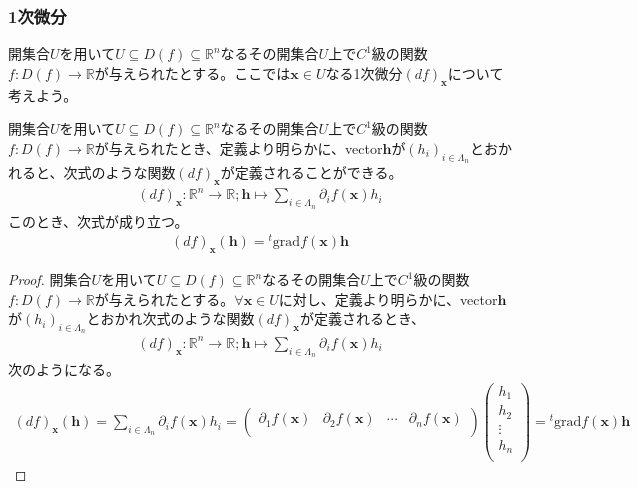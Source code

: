 \documentclass[dvipdfmx]{jsarticle}
\begin{document}
\subsubsection{1次微分}%
開集合$U$を用いて$U \subseteq D(f) \subseteq \mathbb{R}^{n}$なるその開集合$U$上で$C^{1}$級の関数$f:D(f) \rightarrow \mathbb{R}$が与えられたとする。ここでは$\mathbf{x} \in U$なる1次微分$(df)_{\mathbf{x}}$について考えよう。
\begin{thm}\label{4.2.7.3}
開集合$U$を用いて$U \subseteq D(f) \subseteq \mathbb{R}^{n}$なるその開集合$U$上で$C^{1}$級の関数$f:D(f) \rightarrow \mathbb{R}$が与えられたとき、定義より明らかに、vector$\mathbf{h}$が$\left( h_{i} \right)_{i \in \varLambda_{n}}$とおかれると、次式のような関数$(df)_{\mathbf{x}}$が定義されることができる。
\begin{align*}
(df)_{\mathbf{x}}:\mathbb{R}^{n} \rightarrow \mathbb{R};\mathbf{h} \mapsto \sum_{i \in \varLambda_{n}} {\partial_{i}f\left( \mathbf{x} \right)h_{i}}
\end{align*}
このとき、次式が成り立つ。
\begin{align*}
(df)_{\mathbf{x}}\left( \mathbf{h} \right) ={}^{t}\mathrm{grad}f\left( \mathbf{x} \right)\mathbf{h}
\end{align*}
\end{thm}
\begin{proof}
開集合$U$を用いて$U \subseteq D(f) \subseteq \mathbb{R}^{n}$なるその開集合$U$上で$C^{1}$級の関数$f:D(f) \rightarrow \mathbb{R}$が与えられたとする。$\forall\mathbf{x} \in U$に対し、定義より明らかに、vector$\mathbf{h}$が$\left( h_{i} \right)_{i \in \varLambda_{n}}$とおかれ次式のような関数$(df)_{\mathbf{x}}$が定義されるとき、
\begin{align*}
(df)_{\mathbf{x}}:\mathbb{R}^{n} \rightarrow \mathbb{R};\mathbf{h} \mapsto \sum_{i \in \varLambda_{n}} {\partial_{i}f\left( \mathbf{x} \right)h_{i}}
\end{align*}
次のようになる。
\begin{align*}
(df)_{\mathbf{x}}\left( \mathbf{h} \right) = \sum_{i \in \varLambda_{n}} {\partial_{i}f\left( \mathbf{x} \right)h_{i}} = \begin{pmatrix}
\partial_{1}f\left( \mathbf{x} \right) & \partial_{2}f\left( \mathbf{x} \right) & \cdots & \partial_{n}f\left( \mathbf{x} \right) \\
\end{pmatrix}\begin{pmatrix}
h_{1} \\
h_{2} \\
 \vdots \\
h_{n} \\
\end{pmatrix} ={}^{t}\mathrm{grad}f\left( \mathbf{x} \right)\mathbf{h}
\end{align*}
\end{proof}
\end{document}
